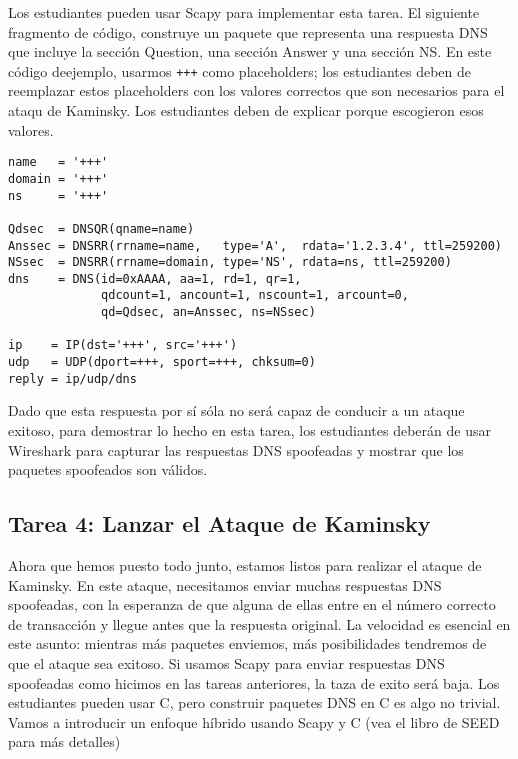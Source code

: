 Los estudiantes pueden usar Scapy para implementar esta tarea. El siguiente fragmento de código, construye un paquete que representa una respuesta DNS que incluye la sección Question, una sección Answer y una sección NS.
En este código deejemplo, usarmos \texttt{+++} como placeholders; los estudiantes deben de reemplazar estos placeholders con los valores correctos que son necesarios para el ataqu de Kaminsky. Los estudiantes deben de explicar porque escogieron esos valores.


\begin{lstlisting}
name   = '+++'  
domain = '+++'  
ns     = '+++'

Qdsec  = DNSQR(qname=name)
Anssec = DNSRR(rrname=name,   type='A',  rdata='1.2.3.4', ttl=259200)
NSsec  = DNSRR(rrname=domain, type='NS', rdata=ns, ttl=259200)
dns    = DNS(id=0xAAAA, aa=1, rd=1, qr=1,
             qdcount=1, ancount=1, nscount=1, arcount=0,
             qd=Qdsec, an=Anssec, ns=NSsec)

ip    = IP(dst='+++', src='+++')
udp   = UDP(dport=+++, sport=+++, chksum=0)
reply = ip/udp/dns
\end{lstlisting}
 
Dado que esta respuesta por sí sóla no será capaz de conducir a un ataque exitoso, para demostrar lo hecho en esta tarea, los estudiantes deberán de usar Wireshark para capturar las respuestas DNS spoofeadas y mostrar que los paquetes spoofeados son válidos.


\subsection{Tarea 4: Lanzar el Ataque de Kaminsky}   

Ahora que hemos puesto todo junto, estamos listos para realizar el ataque de Kaminsky.
En este ataque, necesitamos enviar muchas respuestas DNS spoofeadas, con la esperanza de que alguna de ellas entre en el número correcto de transacción y llegue antes que la respuesta original.
La velocidad es esencial en este asunto: mientras más paquetes enviemos, más posibilidades tendremos de que el ataque sea exitoso.
Si usamos Scapy para enviar respuestas DNS spoofeadas como hicimos en las tareas anteriores, la taza de exito será baja. Los estudiantes pueden usar C, pero construir paquetes DNS en C es algo no trivial.
Vamos a introducir un enfoque híbrido usando Scapy y C (vea el libro de SEED para más detalles)

